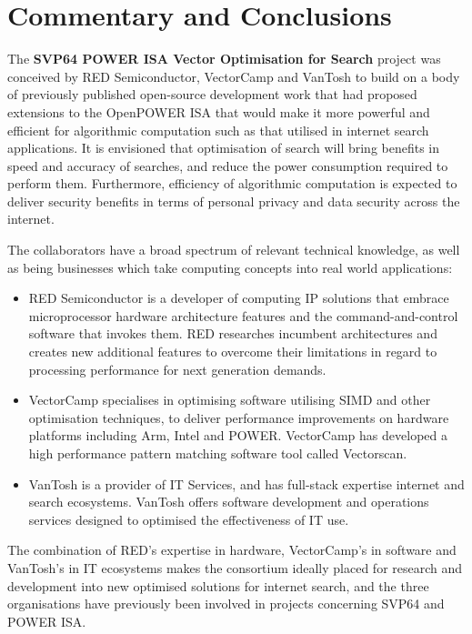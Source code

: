 \chapter{Commentary and Conclusions}

The \textbf{\acrshort{SVP64} \acrshort{POWER} \acrshort{ISA} Vector Optimisation for Search}
project was conceived by RED Semiconductor, VectorCamp and VanTosh to build on
a body of previously published open-source development work that had proposed
extensions to the OpenPOWER \acrfull{ISA} that would make it more powerful and
efficient for algorithmic computation such as that utilised in internet search
applications. It is envisioned that optimisation of search will bring benefits
in speed and accuracy of searches, and reduce the power consumption required to
perform them.
Furthermore, efficiency of algorithmic computation is expected to deliver
security benefits in terms of personal privacy and data security
across the internet.

The collaborators have a broad spectrum of relevant technical knowledge, as
well as being businesses which take computing concepts into real world
applications:
\begin{itemize}
  \item RED Semiconductor is a developer of computing IP solutions that embrace
  microprocessor hardware architecture features and the command-and-control
  software that invokes them. RED researches incumbent architectures and
  creates new additional features to overcome their limitations in regard to
  processing performance for next generation demands.
  \item VectorCamp specialises in optimising software utilising \acrshort{SIMD}
  and other optimisation techniques, to deliver performance improvements on
  hardware platforms including Arm, Intel and \acrshort{POWER}. VectorCamp has
  developed a high performance pattern matching software tool called Vectorscan.
  \item VanTosh is a provider of IT Services, and has full-stack expertise
  internet and search ecosystems. VanTosh offers software development and
  operations services designed to optimised the effectiveness of IT use.
\end{itemize}

The combination of RED’s expertise in hardware, VectorCamp’s in software and
VanTosh’s in IT ecosystems makes the consortium ideally placed for research and
development into new optimised solutions for internet search, and the three
organisations have previously been involved in projects concerning
\acrshort{SVP64} and \acrshort{POWER} \acrshort{ISA}.


